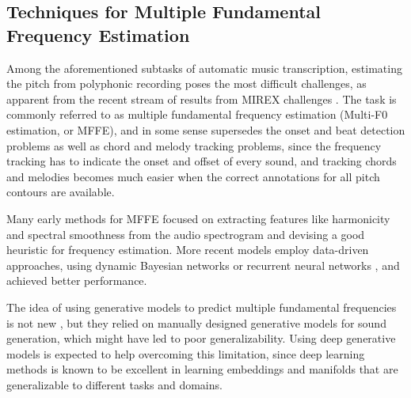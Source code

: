 \subsection{Techniques for Multiple Fundamental Frequency Estimation}

Among the aforementioned subtasks of automatic music transcription, estimating the pitch from polyphonic recording poses the most difficult challenges, as apparent from the recent stream of results from MIREX challenges \cite{downie2014mirex}.
The task is commonly referred to as multiple fundamental frequency estimation (Multi-F0 estimation, or MFFE), and in some sense supersedes the onset and beat detection problems as well as chord and melody tracking problems,
since the frequency tracking has to indicate the onset and offset of every sound, and tracking chords and melodies becomes much easier when the correct annotations for all pitch contours are available.

Many early methods for MFFE \cite{klapuri2003multiple,emiya2010multipitch} focused on extracting features like harmonicity and spectral smoothness from the audio spectrogram and devising a good heuristic for frequency estimation.
More recent models employ data-driven approaches, using dynamic Bayesian networks \cite{raczynski2013dynamic} or recurrent neural networks \cite{sigtia2016endtoend}, and achieved better performance.

The idea of using generative models to predict multiple fundamental frequencies is not new \cite{dubois2005harmonic,cemgil2006generative}, but they relied on manually designed generative models for sound generation, which might have led to poor generalizability.
Using deep generative models is expected to help overcoming this limitation, since deep learning methods is known to be excellent in learning embeddings and manifolds that are generalizable to different tasks and domains.



